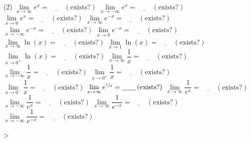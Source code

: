 \documentclass[12pt,]{book}
\theoremstyle{plain}
\theoremstyle{definition}
\theoremstyle{definition}
\theoremstyle{definition}
\theoremstyle{definition}
\theoremstyle{definition}
\numberwithin{equation}{section}
\newcommand{\fe}[2]{#1\mathopen{}\left(#2\right)\mathclose{}}
\begin{document}
\begin{exercisegroup}(2)
\exercise[24.]\hypertarget{exercise-160}{}\(\lim\limits_{x\to\infty}e^x=\underline{\qquad}\,(\text{exists?})\)%
\exercise[25.]\hypertarget{exercise-161}{}\(\lim\limits_{x\to-\infty}e^x=\underline{\qquad}\,(\text{exists?})\)%
\exercise[26.]\hypertarget{exercise-162}{}\(\lim\limits_{x\to0}e^x=\underline{\qquad}\,(\text{exists?})\)%
\exercise[27.]\hypertarget{exercise-163}{}\(\lim\limits_{x\to\infty}e^{-x}=\underline{\qquad}\,(\text{exists?})\)%
\exercise[28.]\hypertarget{exercise-164}{}\(\lim\limits_{x\to-\infty}e^{-x}=\underline{\qquad}\,(\text{exists?})\)%
\exercise[29.]\hypertarget{exercise-165}{}\(\lim\limits_{x\to0}e^{-x}=\underline{\qquad}\,(\text{exists?})\)%
\exercise[30.]\hypertarget{exercise-166}{}\(\lim\limits_{x\to\infty}\fe{\ln}{x}=\underline{\qquad}\,(\text{exists?})\)%
\exercise[31.]\hypertarget{exercise-167}{}\(\lim\limits_{x\to1}\fe{\ln}{x}=\underline{\qquad}\,(\text{exists?})\)%
\exercise[32.]\hypertarget{exercise-168}{}\(\lim\limits_{x\to0^{+}}\fe{\ln}{x}=\underline{\qquad}\,(\text{exists?})\)%
\exercise[33.]\hypertarget{exercise-169}{}\(\lim\limits_{x\to\infty}\dfrac{1}{x}=\underline{\qquad}\,(\text{exists?})\)%
\exercise[34.]\hypertarget{exercise-170}{}\(\lim\limits_{x\to-\infty}\dfrac{1}{x}=\underline{\qquad}\,(\text{exists?})\)%
\exercise[35.]\hypertarget{exercise-171}{}\(\lim\limits_{x\to0^{+}}\dfrac{1}{x}=\underline{\qquad}\,(\text{exists?})\)%
\exercise[36.]\hypertarget{exercise-172}{}\(\lim\limits_{x\to0^{-}}\dfrac{1}{x}=\underline{\qquad}\,(\text{exists?})\)%
\exercise[37.]\hypertarget{exercise-173}{}\(\lim\limits_{x\to\infty}e^{\sfrac{1}{x}}=\underline{\qquad}\,(\text{exists?})\)%
\exercise[38.]\hypertarget{exercise-174}{}\(\lim\limits_{x\to\infty}\dfrac{1}{e^x}=\underline{\qquad}\,(\text{exists?})\)%
\exercise[39.]\hypertarget{exercise-175}{}\(\lim\limits_{x\to-\infty}\dfrac{1}{e^x}=\underline{\qquad}\,(\text{exists?})\)%
\exercise[40.]\hypertarget{exercise-176}{}\(\lim\limits_{x\to\infty}\dfrac{1}{e^{-x}}=\underline{\qquad}\,(\text{exists?})\)%
\exercise[41.]\hypertarget{exercise-177}{}\(\lim\limits_{x\to-\infty}\dfrac{1}{e^{-x}}=\underline{\qquad}\,(\text{exists?})\)%
\end{exercisegroup}
\par\smallskip\noindent
>
%
%
\appendix
%
\typeout{************************************************}
\typeout{************************************************}
\end{document}
